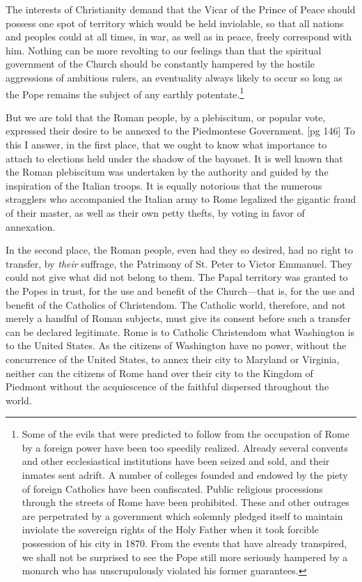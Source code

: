 The interests of Christianity demand that the
Vicar of the Prince of Peace should possess one
spot of territory which would be held inviolable,
so that all nations and peoples could at all times,
in war, as well as in peace, freely correspond with
him. Nothing can be more revolting to our feelings
than that the spiritual government of the
Church should be constantly hampered by the
hostile aggressions of ambitious rulers, an
eventuality always likely to occur so long as the
Pope remains the subject of any earthly potentate.\footnote{Some
of the evils that were predicted to follow from the
occupation of Rome by a foreign power have been too speedily
realized. Already several convents and other ecclesiastical
institutions have been seized and sold, and their inmates sent
adrift. A number of colleges founded and endowed by the
piety of foreign Catholics have been confiscated. Public religious
processions through the streets of Rome have been prohibited.
These and other outrages are perpetrated by a
government which solemnly pledged itself to maintain inviolate
the sovereign rights of the Holy Father when it took
forcible possession of his city in 1870. From the events that
have already transpired, we shall not be surprised to see the
Pope still more seriously hampered by a monarch who has unscrupulously
violated his former guarantees.}

But we are told that the Roman people, by a
plebiscitum, or popular vote, expressed their desire
to be annexed to the Piedmontese Government.
[pg 146]
To this I answer, in the first place, that we
ought to know what importance to attach to elections
held under the shadow of the bayonet. It is
well known that the Roman plebiscitum was undertaken
by the authority and guided by the inspiration
of the Italian troops. It is equally notorious
that the numerous stragglers who accompanied
the Italian army to Rome legalized the
gigantic fraud of their master, as well as their own
petty thefts, by voting in favor of annexation.

In the second place, the Roman people, even had
they so desired, had no right to transfer, by \emph{their}
suffrage, the Patrimony of St. Peter to Victor Emmanuel.
They could not give what did not belong
to them. The Papal territory was granted to the
Popes in trust, for the use and benefit of the
Church—that is, for the use and benefit of the
Catholics of Christendom. The Catholic world,
therefore, and not merely a handful of Roman subjects,
must give its consent before such a transfer
can be declared legitimate. Rome is to Catholic
Christendom what Washington is to the United
States. As the citizens of Washington have no
power, without the concurrence of the United
States, to annex their city to Maryland or Virginia,
neither can the citizens of Rome hand over
their city to the Kingdom of Piedmont without the
acquiescence of the faithful dispersed throughout
the world.

